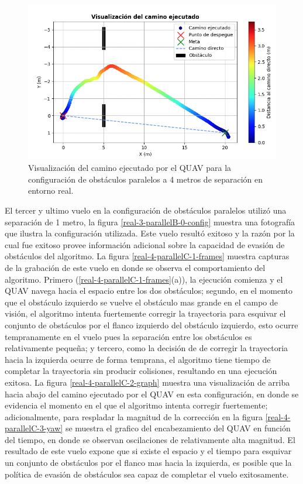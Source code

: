 \begin{figure}[H]
    \centering
    \includegraphics[scale=0.5]{partes/img/real-3-parallelB-2-graph.png}
    \caption[Visualización del camino ejecutado por el QUAV para la configuración de obstáculos paralelos a 4 metros de separación en entorno real.]{Visualización del camino ejecutado por el QUAV para la configuración de obstáculos paralelos a 4 metros de separación en entorno real.}
    \label{real-3-parallelB-2-graph}
\end{figure}

El tercer y ultimo vuelo en la configuración de obstáculos paralelos utilizó una separación de 1 metro, la figura \ref{real-3-parallelB-0-config} muestra una fotografía que ilustra la configuración utilizada. Este vuelo resultó exitoso y la razón por la cual fue exitoso provee información adicional sobre la capacidad de evasión de obstáculos del algoritmo. La figura \ref{real-4-parallelC-1-frames} muestra capturas de la grabación de este vuelo en donde se observa el comportamiento del algoritmo. Primero (\ref{real-4-parallelC-1-frames}(a)), la ejecución comienza y el QUAV navega hacia el espacio entre los dos obstáculos; segundo, en el momento que el obstáculo izquierdo se vuelve el obstáculo mas grande en el campo de visión, el algoritmo intenta fuertemente corregir la trayectoria para esquivar el conjunto de obstáculos por el flanco izquierdo del obstáculo izquierdo, esto ocurre tempranamente en el vuelo pues la separación entre los obstáculos es relativamente pequeña; y tercero, como la decisión de de corregir la trayectoria hacia la izquierda ocurre de forma temprana, el algoritmo tiene tiempo de completar la trayectoria sin producir colisiones, resultando en una ejecución exitosa. La figura \ref{real-4-parallelC-2-graph} muestra una visualización de arriba hacia abajo del camino ejecutado por el QUAV en esta configuración, en donde se evidencia el momento en el que el algoritmo intenta corregir fuertemente; adicionalmente, para respladar la magnitud de la corrección en la figura \ref{real-4-parallelC-3-yaw} se muestra el grafico del encabezamiento del QUAV en función del tiempo, en donde se observan oscilaciones de relativamente alta magnitud. El resultado de este vuelo expone que si existe el espacio y el tiempo para esquivar un conjunto de obstáculos por el flanco mas hacia la izquierda, es posible que la política de evasión de obstáculos sea capaz de completar el vuelo exitosamente.

